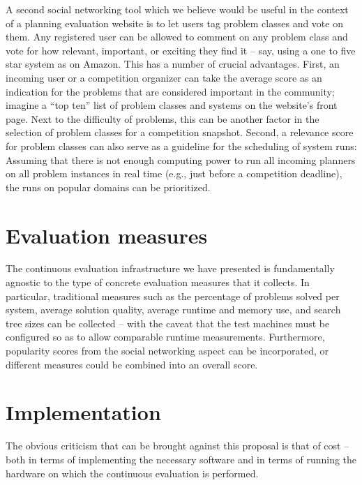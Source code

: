 A second social networking tool which we believe would be useful in
the context of a planning evaluation website is to let users tag
problem classes and vote on them.  Any registered user can be allowed
to comment on any problem class and vote for how relevant, important,
or exciting they find it -- say, using a one to five star system as on
Amazon.  This has a number of crucial advantages.  First, an incoming
user or a competition organizer can take the average score as an
indication for the problems that are considered important in the
community; imagine a ``top ten'' list of problem classes and systems
on the website's front page.  Next to the difficulty of problems, this
can be another factor in the selection of problem classes for a
competition snapshot.  Second, a relevance score for problem classes
can also serve as a guideline for the scheduling of system runs:
Assuming that there is not enough computing power to run all incoming
planners on all problem instances in real time (e.g., just before a
competition deadline), the runs on popular domains can be prioritized.






\section{Evaluation measures}

The continuous evaluation infrastructure we have presented is
fundamentally agnostic to the type of concrete evaluation measures
that it collects.  In particular, traditional measures such as the
percentage of problems solved per system, average solution quality,
average runtime and memory use, and search tree sizes can be collected
-- with the caveat that the test machines must be configured so as to
allow comparable runtime measurements.  Furthermore, popularity scores
from the social networking aspect can be incorporated, or different
measures could be combined into an overall score.



\section{Implementation}

The obvious criticism that can be brought against this proposal is
that of cost -- both in terms of implementing the necessary software
and in terms of running the hardware on which the continuous
evaluation is performed.

